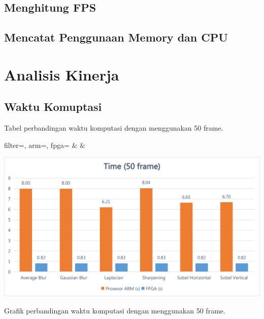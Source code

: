 \subsection{Menghitung FPS}
\subsection{Mencatat Penggunaan Memory dan CPU}


\section{Analisis Kinerja}
\subsection{Waktu Komuptasi}
\begin{atable}
    \caption{Tabel perbandingan waktu komputasi dengan menggunakan 50 frame.}
    \label{table:hasil-time50}
        {filter=\filter, arm=\arm, fpga=\fpga}
        {\filter & \arm & \fpga }
\end{atable}
\blindtext
\begin{afigure}
    \includegraphics[width=0.9\linewidth, center]{images/chart/chart-time50.png}
    \caption{Grafik perbandingan waktu komputasi dengan menggunakan 50 frame.}
    \label{fig:chart-time50}
\end{afigure}



